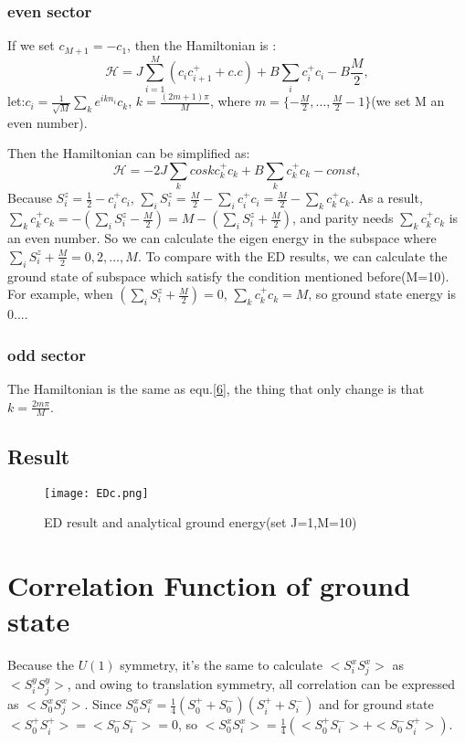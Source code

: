 \documentclass[UTF8]{ctexart}
\begin{document}
\subsubsection{even sector}
If we set $c_{M+1}=-c_1$, then the Hamiltonian is :
\begin{equation}
\label{5}
\mathcal{H}=J\sum_{i=1}^{M}(c_ic_{i+1}^++c.c)+B\sum_{i}c_i^+c_i-B\frac{M}{2},
\end{equation}
let:$c_i=\frac{1}{\sqrt{M}}\sum_{k}e^{ikn_i}c_k$, $k=\frac{(2m+1)\pi}{M}$, where $m=\{-\frac{M}{2},\ldots,\frac{M}{2}-1\}$(we set M an even number).
\par
Then the Hamiltonian can be simplified as:
\begin{equation}
\mathcal{H}=-2J\sum_{k}coskc_k^+c_k+B\sum_{k}c_k^+c_k-const,
\label{6}
\end{equation}
Because $S_i^z=\frac{1}{2}-c_i^+c_i$, $\sum_{i}S_i^z=\frac{M}{2}-\sum_{i}c_i^+c_i=\frac{M}{2}-\sum_{k}c_k^+c_k$. As a result, $\sum_{k}c_k^+c_k=-(\sum_{i}S_i^z-\frac{M}{2})=M-(\sum_{i}S_i^z+\frac{M}{2})$, and parity needs $\sum_{k}c_k^+c_k$ is an even number. So we can calculate the eigen energy in the subspace where $\sum_{i}S_i^z+\frac{M}{2}={0,2,\ldots,M}$. To compare with the ED results, we can calculate the ground state of subspace which satisfy the condition mentioned before(M=10). For example, when $(\sum_{i}S_i^z+\frac{M}{2})=0$, $\sum_{k}c_k^+c_k=M$, so ground state energy is 0....
\subsubsection{odd sector}
The Hamiltonian is the same as equ.\ref{6}, the thing that only change is that $k=\frac{2m\pi}{M}$.
\subsection{Result}
\begin{figure}[H]
	\centering
	\texttt{[image: EDc.png]}
	\caption{ED result and analytical ground energy(set J=1,M=10)}
	\label{fig_2}
\end{figure}
\section{Correlation Function of ground state}
Because the $U(1)$ symmetry, it's the same to calculate $<S_i^xS_j^x>$ as $<S_i^yS_j^y>$, and owing to translation symmetry, all correlation can be expressed as $<S_0^xS_j^x>$. Since $S_0^xS_i^x=\frac{1}{4}(S_0^++S_0^-)(S_i^++S_i^-)$ and for ground state $<S_0^+S_i^+>=<S_0^-S_i^->=0$, so $<S_0^xS_i^x>=\frac{1}{4}(<S_0^+S_i^->+<S_0^-S_i^+>)$.
\end{document}
